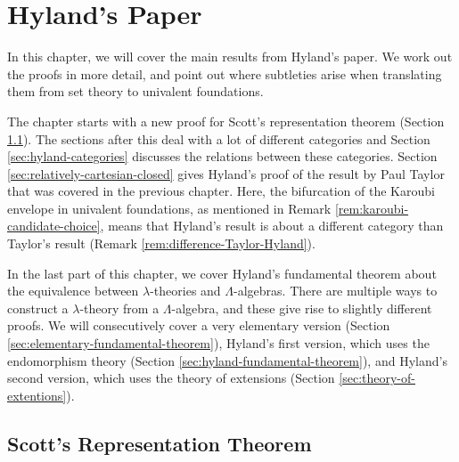 \chapter{Hyland's Paper}\label{ch:the-paper}

In this chapter, we will cover the main results from Hyland's paper. We work out the proofs in more detail, and point out where subtleties arise when translating them from set theory to univalent foundations.

The chapter starts with a new proof for Scott's representation theorem (Section \ref{sec:hyland-scott}). The sections after this deal with a lot of different categories and Section \ref{sec:hyland-categories} discusses the relations between these categories. Section \ref{sec:relatively-cartesian-closed} gives Hyland's proof of the result by Paul Taylor that was covered in the previous chapter. Here, the bifurcation of the Karoubi envelope in univalent foundations, as mentioned in Remark \ref{rem:karoubi-candidate-choice}, means that Hyland's result is about a different category than Taylor's result (Remark \ref{rem:difference-Taylor-Hyland}).

In the last part of this chapter, we cover Hyland's fundamental theorem about the equivalence between $ \lambda $-theories and $ \Lambda $-algebras. There are multiple ways to construct a $ \lambda $-theory from a $ \Lambda $-algebra, and these give rise to slightly different proofs. We will consecutively cover a very elementary version (Section \ref{sec:elementary-fundamental-theorem}), Hyland's first version, which uses the endomorphism theory (Section \ref{sec:hyland-fundamental-theorem}), and Hyland's second version, which uses the theory of extensions (Section \ref{sec:theory-of-extentions}).

\section{Scott's Representation Theorem}\label{sec:hyland-scott}

